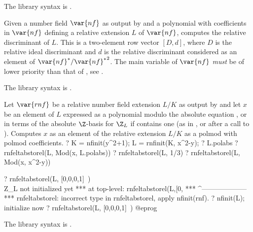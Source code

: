 The library syntax is .

\label{se:rnfdisc}
Given a number field $\var{nf}$ as
output by  and a polynomial  with coefficients in
$\var{nf}$ defining a relative extension $L$ of $\var{nf}$, computes the
relative discriminant of $L$. This is a two-element row vector $[D,d]$, where
$D$ is the relative ideal discriminant and $d$ is the relative discriminant
considered as an element of $\var{nf}^*/{\var{nf}^*}^2$. The main variable of
$\var{nf}$ \emph{must} be of lower priority than that of , see
.

The library syntax is .

\label{se:rnfeltabstorel}
Let $\var{rnf}$ be a relative
number field extension $L/K$ as output by  and let $x$ be an
element of $L$ expressed as a polynomial modulo the absolute equation
, or in terms of the absolute $\Z$-basis for $\Z_L$
if  contains one (as in , or after
a call to ).
Computes $x$ as an element of the relative extension
$L/K$ as a polmod with polmod coefficients.
\bprog
? K = nfinit(y^2+1); L = rnfinit(K, x^2-y);
? L.polabs
? rnfeltabstorel(L, Mod(x, L.polabs))
? rnfeltabstorel(L, 1/3)
? rnfeltabstorel(L, Mod(x, x^2-y))

? rnfeltabstorel(L, [0,0,0,1]~) \\ Z_L not initialized yet
 ***   at top-level: rnfeltabstorel(L,[0,
 ***                 ^--------------------
 *** rnfeltabstorel: incorrect type in rnfeltabstorel, apply nfinit(rnf).
? nfinit(L); \\ initialize now
? rnfeltabstorel(L, [0,0,0,1]~)
@eprog

The library syntax is .

